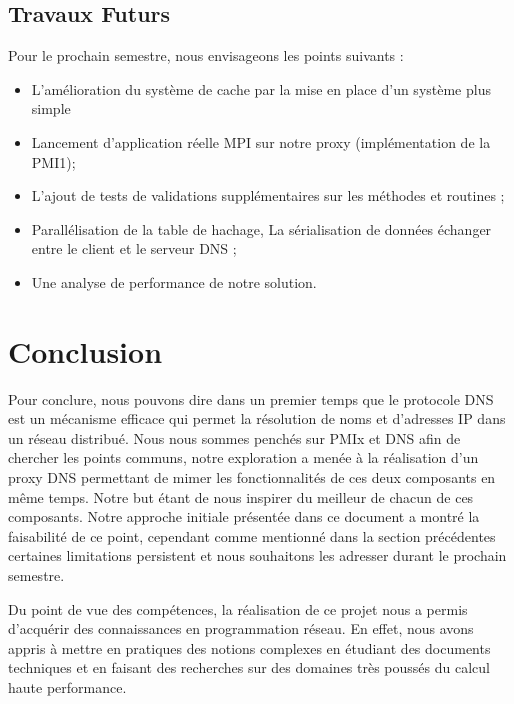 \documentclass[12pt,a4paper]{article}
\begin{document}
\subsection{Travaux Futurs}

\quad Pour le prochain semestre, nous envisageons les points suivants :
\begin{itemize}
    \item L'amélioration du système de cache par la mise en place d'un système plus simple
    \item Lancement d'application réelle MPI sur notre proxy (implémentation de la PMI1);
    \item L'ajout de tests de validations supplémentaires sur les méthodes et routines ;
    \item Parallélisation de la table de hachage,  
    \itdem La sérialisation de données échanger entre le client et le serveur DNS ;
    \item Une analyse de performance de notre solution.
\end{itemize}

\newpage
\section*{Conclusion}

\quad Pour conclure, nous pouvons dire dans un premier temps que le protocole DNS est un mécanisme efficace qui permet la résolution de noms et d’adresses IP dans un réseau distribué. Nous nous sommes penchés sur PMIx et DNS afin de chercher les points communs, notre exploration a menée à la réalisation d'un proxy DNS permettant de mimer les fonctionnalités de ces deux composants en même temps. Notre but étant de nous inspirer du meilleur de chacun de ces composants. Notre approche initiale présentée dans ce document a montré la faisabilité de ce point, cependant comme mentionné dans la section précédentes certaines limitations persistent et nous souhaitons les adresser durant le prochain semestre.

\quad Du point de vue des compétences, la réalisation de ce projet nous a permis d’acquérir des connaissances en programmation réseau. En effet, nous avons appris à mettre en pratiques des notions complexes en étudiant des documents techniques et en faisant des recherches sur des domaines très poussés du calcul haute performance.
\end{document}
